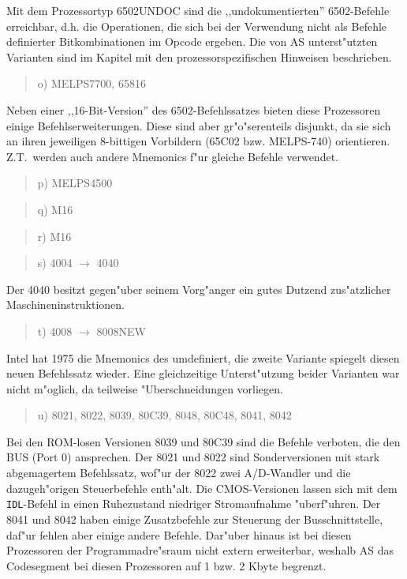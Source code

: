 \documentclass[12pt,a4paper,twoside]{report}
\newcommand{\tty}[1]{{\tt #1}}
\begin{document}
{Mit dem Prozessortyp 6502UNDOC sind die ,,undokumentierten''
6502-Befehle erreichbar, d.h. die Operationen, die sich bei der Verwendung
nicht als Befehle definierter Bitkombinationen im Opcode ergeben.  Die von
AS unterst"utzten Varianten sind im Kapitel mit den prozessorspezifischen
Hinweisen beschrieben.
\begin{quote}
o) MELPS7700, 65816
\end{quote}
Neben einer ,,16-Bit-Version'' des 6502-Befehlssatzes bieten diese
Prozessoren einige Befehlserweiterungen.  Diese sind aber gr"o"serenteils
disjunkt, da sie sich an ihren jeweiligen 8-bittigen Vorbildern (65C02
bzw. MELPS-740) orientieren.  Z.T.~werden auch andere Mnemonics f"ur
gleiche Befehle verwendet.
\begin{quote}
p) MELPS4500
\end{quote}
\begin{quote}
q) M16
\end{quote}
\begin{quote}
r) M16
\end{quote}
\begin{quote}
s) 4004 $\rightarrow$ 4040
\end{quote}
Der 4040 besitzt gegen"uber seinem Vorg"anger ein gutes Dutzend
zus"atzlicher Maschineninstruktionen.
\begin{quote}
t) 4008 $\rightarrow$ 8008NEW
\end{quote}
Intel hat 1975 die Mnemonics des umdefiniert, die zweite Variante spiegelt 
diesen neuen Befehlssatz wieder.  Eine gleichzeitige Unterst"utzung beider 
Varianten war nicht m"oglich, da teilweise "Uberschneidungen vorliegen.
\begin{quote}
u) 8021, 8022, 8039, 80C39, 8048, 80C48, 8041, 8042
\end{quote}
Bei den ROM-losen Versionen 8039 und 80C39 sind die Befehle verboten,
die den BUS (Port 0) ansprechen.  Der 8021 und 8022 sind Sonderversionen
mit stark abgemagertem Befehlssatz, wof"ur der 8022 zwei A/D-Wandler
und die dazugeh"origen Steuerbefehle enth"alt.  Die CMOS-Versionen lassen
sich mit dem \tty{IDL}-Befehl in einen Ruhezustand niedriger Stromaufnahme
"uberf"uhren.  Der 8041 und 8042 haben einige Zusatzbefehle zur
Steuerung der Busschnittstelle, daf"ur fehlen aber einige andere Befehle.
Dar"uber hinaus ist bei diesen Prozessoren der Programmadre"sraum nicht
extern erweiterbar, weshalb AS das Codesegment bei diesen Prozessoren
auf 1 bzw. 2 Kbyte begrenzt.
}
\end{document}
